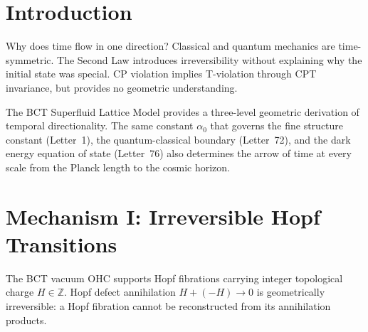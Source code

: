 \documentclass[aps,prl,twocolumn,showpacs,superscriptaddress]{revtex4-2}
\begin{document}
\begin{abstract}
We derive the arrow of time from BCT vacuum geometry through three nested 
mechanisms, each governed by $\alpha_0 = r_{\rm oct} \times r_{\rm tet}/\pi 
= 0.0074081$. At the microscopic (Planck) scale, irreversible Hopf charge 
annihilation $H\to 0$ defines a geometrically one-directional time operator. 
At the mesoscopic scale, the quantum-classical threshold $N_c = 1/\alpha_0 
\approx 135$ (Letter~72) marks the boundary where Hopf transitions generate 
irreversible thermodynamic entropy. At the cosmological scale, the Josephson 
correction $\Delta w = 2\alpha_0$ (Letter~76) breaks time-reversal symmetry 
in the equation of state. The BCT Arrow of Time Theorem states: temporal 
directionality is a geometric necessity following from $H \in \mathbb{Z}$ and 
the Josephson self-correction. The constant $\alpha_0$ is simultaneously the 
electromagnetic coupling seed, the quantum-classical boundary, and the 
geometric T-violation parameter.
\end{abstract}

\maketitle

\section{Introduction}

Why does time flow in one direction? Classical and quantum mechanics are 
time-symmetric. The Second Law introduces irreversibility without explaining 
why the initial state was special. CP violation implies T-violation through 
CPT invariance, but provides no geometric understanding.

The BCT Superfluid Lattice Model provides a three-level geometric derivation 
of temporal directionality. The same constant $\alpha_0$ that governs the 
fine structure constant (Letter~1), the quantum-classical boundary (Letter~72), 
and the dark energy equation of state (Letter~76) also determines the arrow 
of time at every scale from the Planck length to the cosmic horizon.

\section{Mechanism I: Irreversible Hopf Transitions}

The BCT vacuum OHC supports Hopf fibrations carrying integer topological 
charge $H \in \mathbb{Z}$. Hopf defect annihilation $H + (-H) \to 0$ is 
geometrically irreversible: a Hopf fibration cannot be reconstructed from 
its annihilation products.
\end{document}
